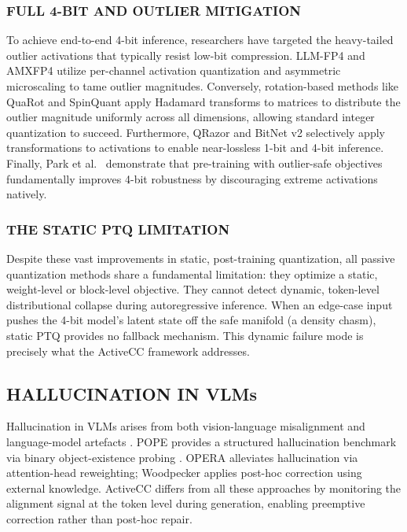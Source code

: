 \documentclass{ieeetmlcn}
\begin{document}
\subsubsection{FULL 4-BIT AND OUTLIER MITIGATION}
To achieve end-to-end 4-bit inference, researchers have targeted the heavy-tailed outlier activations that typically resist low-bit compression. LLM-FP4 \cite{liu2023llmfp4} and AMXFP4 \cite{rouhani2023microscaling} utilize per-channel activation quantization and asymmetric microscaling to tame outlier magnitudes. Conversely, rotation-based methods like QuaRot \cite{NEURIPS2024_b5b93943} and SpinQuant \cite{liu2025spinquant} apply Hadamard transforms to matrices to distribute the outlier magnitude uniformly across all dimensions, allowing standard integer quantization to succeed. Furthermore, QRazor \cite{qrazor2024} and BitNet v2 \cite{ma2025bitnetv2} selectively apply transformations to activations to enable near-lossless 1-bit and 4-bit inference. Finally, Park et al.\ \cite{park-etal-2025-outlier} demonstrate that pre-training with outlier-safe objectives fundamentally improves 4-bit robustness by discouraging extreme activations natively.

\subsubsection{THE STATIC PTQ LIMITATION}
Despite these vast improvements in static, post-training quantization, all passive quantization methods share a fundamental limitation: they optimize a static, weight-level or block-level objective. They cannot detect dynamic, token-level distributional collapse during autoregressive inference. When an edge-case input pushes the 4-bit model's latent state off the safe manifold (a density chasm), static PTQ provides no fallback mechanism. This dynamic failure mode is precisely what the ActiveCC framework addresses.

\subsection{HALLUCINATION IN VLMs}
Hallucination in VLMs arises from both vision-language misalignment and language-model artefacts \cite{huang2025survey}. POPE provides a structured hallucination benchmark via binary object-existence probing \cite{li2023pope}. OPERA \cite{huang2023opera} alleviates hallucination via attention-head reweighting; Woodpecker \cite{yin2024woodpecker} applies post-hoc correction using external knowledge. ActiveCC differs from all these approaches by monitoring the alignment signal at the token level during generation, enabling preemptive correction rather than post-hoc repair.
\end{document}
